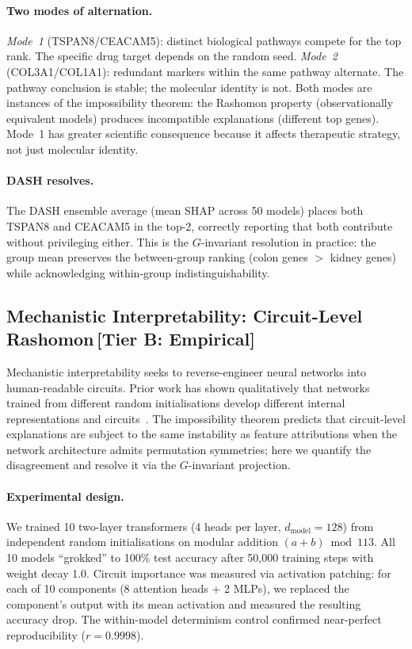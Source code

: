 \documentclass[11pt,a4paper]{article}
\begin{document}
\paragraph{Two modes of alternation.}
\emph{Mode~1} (TSPAN8/CEACAM5): distinct biological pathways compete for the top rank.  The specific drug target depends on the random seed.  \emph{Mode~2} (COL3A1/COL1A1): redundant markers within the same pathway alternate.  The pathway conclusion is stable; the molecular identity is not.  Both modes are instances of the impossibility theorem: the Rashomon property (observationally equivalent models) produces incompatible explanations (different top genes).  Mode~1 has greater scientific consequence because it affects therapeutic strategy, not just molecular identity.

\paragraph{DASH resolves.}
The DASH ensemble average (mean SHAP across 50 models) places both TSPAN8 and CEACAM5 in the top-2, correctly reporting that both contribute without privileging either.  This is the $G$-invariant resolution in practice: the group mean preserves the between-group ranking (colon genes $>$ kidney genes) while acknowledging within-group indistinguishability.

\subsection{Mechanistic Interpretability: Circuit-Level Rashomon\,\textnormal{\normalsize[Tier B: Empirical]}}
\label{sec:mi-v2}

Mechanistic interpretability seeks to reverse-engineer neural networks into human-readable circuits.  Prior work has shown qualitatively that networks trained from different random initialisations develop different internal representations and circuits~\citep{chughtai2023toy}.  The impossibility theorem predicts that circuit-level explanations are subject to the same instability as feature attributions when the network architecture admits permutation symmetries; here we quantify the disagreement and resolve it via the $G$-invariant projection.

\paragraph{Experimental design.}
We trained 10 two-layer transformers (4 heads per layer, $d_{\mathrm{model}} = 128$) from independent random initialisations on modular addition $(a + b) \bmod 113$.  All 10 models ``grokked'' to 100\% test accuracy after 50{,}000 training steps with weight decay 1.0.  Circuit importance was measured via activation patching: for each of 10 components (8 attention heads + 2 MLPs), we replaced the component's output with its mean activation and measured the resulting accuracy drop.  The within-model determinism control confirmed near-perfect reproducibility ($r = 0.9998$).
\end{document}
